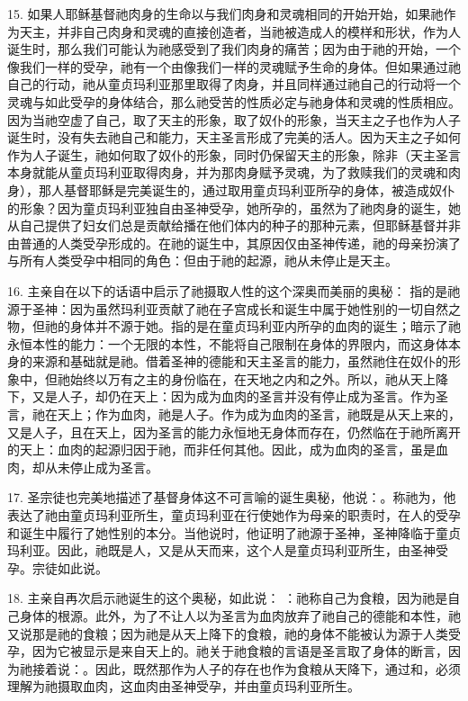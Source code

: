 15. 如果人耶稣基督祂肉身的生命以与我们肉身和灵魂相同的开始开始，如果祂作为天主，并非自己肉身和灵魂的直接创造者，当祂被造成人的模样和形状，作为人诞生时，那么我们可能认为祂感受到了我们肉身的痛苦；因为由于祂的开始，一个像我们一样的受孕，祂有一个由像我们一样的灵魂赋予生命的身体。但如果通过祂自己的行动，祂从童贞玛利亚那里取得了肉身，并且同样通过祂自己的行动将一个灵魂与如此受孕的身体结合，那么祂受苦的性质必定与祂身体和灵魂的性质相应。因为当祂空虚了自己，取了天主的形象，取了奴仆的形象，当天主之子也作为人子诞生时，没有失去祂自己和能力，天主圣言形成了完美的活人。因为天主之子如何作为人子诞生，祂如何取了奴仆的形象，同时仍保留天主的形象，除非（天主圣言本身就能从童贞玛利亚取得肉身，并为那肉身赋予灵魂，为了救赎我们的灵魂和肉身），那人基督耶稣是完美诞生的，通过取用童贞玛利亚所孕的身体，被造成奴仆的形象？因为童贞玛利亚独自由圣神受孕，她所孕的，虽然为了祂肉身的诞生，她从自己提供了妇女们总是贡献给播在他们体内的种子的那种元素，但耶稣基督并非由普通的人类受孕形成的。在祂的诞生中，其原因仅由圣神传递，祂的母亲扮演了与所有人类受孕中相同的角色：但由于祂的起源，祂从未停止是天主。\par

16. 主亲自在以下的话语中启示了祂摄取人性的这个深奥而美丽的奥秘：  指的是祂源于圣神：因为虽然玛利亚贡献了祂在子宫成长和诞生中属于她性别的一切自然之物，但祂的身体并不源于她。指的是在童贞玛利亚内所孕的血肉的诞生；暗示了祂永恒本性的能力：一个无限的本性，不能将自己限制在身体的界限内，而这身体本身的来源和基础就是祂。借着圣神的德能和天主圣言的能力，虽然祂住在奴仆的形象中，但祂始终以万有之主的身份临在，在天地之内和之外。所以，祂从天上降下，又是人子，却仍在天上：因为成为血肉的圣言并没有停止成为圣言。作为圣言，祂在天上；作为血肉，祂是人子。作为成为血肉的圣言，祂既是从天上来的，又是人子，且在天上，因为圣言的能力永恒地无身体而存在，仍然临在于祂所离开的天上：血肉的起源归因于祂，而非任何其他。因此，成为血肉的圣言，虽是血肉，却从未停止成为圣言。\par

17. 圣宗徒也完美地描述了基督身体这不可言喻的诞生奥秘，他说：。称祂为，他表达了祂由童贞玛利亚所生，童贞玛利亚在行使她作为母亲的职责时，在人的受孕和诞生中履行了她性别的本分。当他说时，他证明了祂源于圣神，圣神降临于童贞玛利亚。因此，祂既是人，又是从天而来，这个人是童贞玛利亚所生，由圣神受孕。宗徒如此说。\par

18. 主亲自再次启示祂诞生的这个奥秘，如此说： ：祂称自己为食粮，因为祂是自己身体的根源。此外，为了不让人以为圣言为血肉放弃了祂自己的德能和本性，祂又说那是祂的食粮；因为祂是从天上降下的食粮，祂的身体不能被认为源于人类受孕，因为它被显示是来自天上的。祂关于祂食粮的言语是圣言取了身体的断言，因为祂接着说：。因此，既然那作为人子的存在也作为食粮从天降下，通过和，必须理解为祂摄取血肉，这血肉由圣神受孕，并由童贞玛利亚所生。\par

